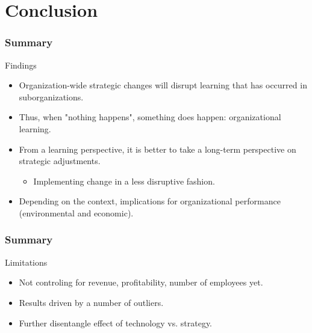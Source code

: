 \section{Conclusion}

\begin{frame}
	\frametitle{Summary}
	\begin{block}{Findings}
		\begin{itemize}
			\item Organization-wide strategic changes will disrupt learning that has occurred in suborganizations.
			\item Thus, when "nothing happens", something does happen: organizational learning.
			\item From a learning perspective, it is better to take a long-term perspective on strategic adjustments.
			\begin{itemize}
				\item Implementing change in a less disruptive fashion.
			\end{itemize}
			\item Depending on the context, implications for organizational performance (environmental and economic).
		\end{itemize}
	\end{block}
\end{frame}

\begin{frame}
	\frametitle{Summary}
	\begin{block}{Limitations}
		\begin{itemize}
			\item Not controling for revenue, profitability, number of employees yet.
			\item Results driven by a number of outliers.
			\item Further disentangle effect of technology vs. strategy.
		\end{itemize}
	\end{block}
\end{frame}